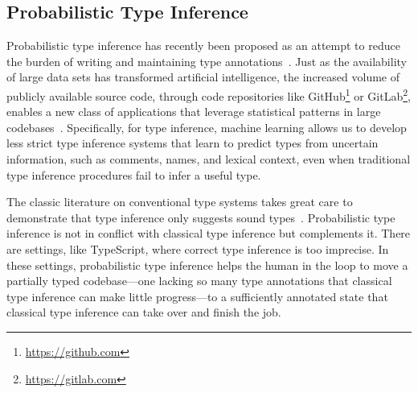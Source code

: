 \documentclass[acmsmall,nonacm]{acmart}\settopmatter{printfolios=true,printccs=false,printacmref=false}
\begin{document}
\subsection{Probabilistic Type Inference}

Probabilistic type inference
has recently been proposed as an attempt to reduce the burden
of writing and maintaining type
annotations~\cite{wei20,raychev15,hellendoorn18}.
Just as the availability of large data sets has transformed artificial intelligence,
the increased volume of publicly available source code, through
code repositories like GitHub\footnote{\href{https://github.com}{https://github.com}}
or GitLab\footnote{\href{https://gitlab.com}{https://gitlab.com}},
enables a new class of applications that leverage statistical
patterns in large codebases~\cite{allamanis17}.
Specifically, for type inference, machine learning
allows us to develop less strict type inference systems
that learn to predict types from uncertain information,
such as comments, names, and lexical context,
even when traditional type inference procedures
fail to infer a useful type.

The classic literature on conventional type systems takes great care to demonstrate
that type inference only suggests sound types~\cite{DBLP:journals/jcss/Milner78,Pierce2002}.
Probabilistic type inference is not in conflict with classical type inference but complements it.
There are settings, like TypeScript, where correct type inference is too imprecise.
In these settings, probabilistic type inference helps the human in the loop to move a
partially typed codebase---one lacking so many type annotations that classical type inference
can make little progress---to a sufficiently annotated state that classical type inference can take over and finish the job.
\end{document}

